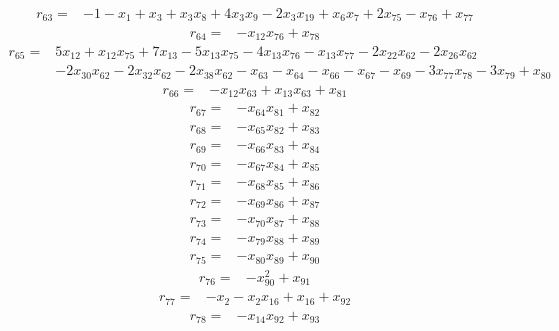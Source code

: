 \[\begin{aligned}
r_{63}={}&-1-x_{1}+x_{3}+x_{3}x_{8}+4x_{3}x_{9}-2x_{3}x_{19}+x_{6}x_{7}+2x_{75}-x_{76}+x_{77}
\end{aligned}\]
\[\begin{aligned}
r_{64}={}&-x_{12}x_{76}+x_{78}
\end{aligned}\]
\[\begin{aligned}
r_{65}={}&5x_{12}+x_{12}x_{75}+7x_{13}-5x_{13}x_{75}-4x_{13}x_{76}-x_{13}x_{77}-2x_{22}x_{62}-2x_{26}x_{62}
\\ &-2x_{30}x_{62}-2x_{32}x_{62}-2x_{38}x_{62}-x_{63}-x_{64}-x_{66}-x_{67}-x_{69}-3x_{77}x_{78}-3x_{79}+x_{80}
\end{aligned}\]
\[\begin{aligned}
r_{66}={}&-x_{12}x_{63}+x_{13}x_{63}+x_{81}
\end{aligned}\]
\[\begin{aligned}
r_{67}={}&-x_{64}x_{81}+x_{82}
\end{aligned}\]
\[\begin{aligned}
r_{68}={}&-x_{65}x_{82}+x_{83}
\end{aligned}\]
\[\begin{aligned}
r_{69}={}&-x_{66}x_{83}+x_{84}
\end{aligned}\]
\[\begin{aligned}
r_{70}={}&-x_{67}x_{84}+x_{85}
\end{aligned}\]
\[\begin{aligned}
r_{71}={}&-x_{68}x_{85}+x_{86}
\end{aligned}\]
\[\begin{aligned}
r_{72}={}&-x_{69}x_{86}+x_{87}
\end{aligned}\]
\[\begin{aligned}
r_{73}={}&-x_{70}x_{87}+x_{88}
\end{aligned}\]
\[\begin{aligned}
r_{74}={}&-x_{79}x_{88}+x_{89}
\end{aligned}\]
\[\begin{aligned}
r_{75}={}&-x_{80}x_{89}+x_{90}
\end{aligned}\]
\[\begin{aligned}
r_{76}={}&-x_{90}^{2}+x_{91}
\end{aligned}\]
\[\begin{aligned}
r_{77}={}&-x_{2}-x_{2}x_{16}+x_{16}+x_{92}
\end{aligned}\]
\[\begin{aligned}
r_{78}={}&-x_{14}x_{92}+x_{93}
\end{aligned}\]
